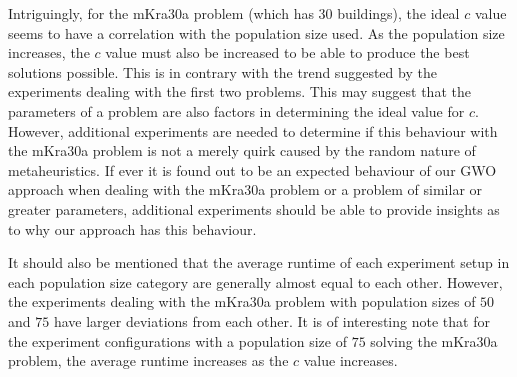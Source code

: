Intriguingly, for the mKra30a problem (which has 30 buildings), the ideal $c$ value seems to have a correlation with the population size used. As the population size increases, the $c$ value must also be increased to be able to produce the best solutions possible. This is in contrary with the trend suggested by the experiments dealing with the first two problems. This may suggest that the parameters of a problem are also factors in determining the ideal value for $c$. However, additional experiments are needed to determine if this behaviour with the mKra30a problem is not a merely quirk caused by the random nature of metaheuristics. If ever it is found out to be an expected behaviour of our GWO approach when dealing with the mKra30a problem or a problem of similar or greater parameters, additional experiments should be able to provide insights as to why our approach has this behaviour.

It should also be mentioned that the average runtime of each experiment setup in each population size category are generally almost equal to each other. However, the experiments dealing with the mKra30a problem with population sizes of $50$ and $75$ have larger deviations from each other. It is of interesting note that for the experiment configurations with a population size of $75$ solving the mKra30a problem, the average runtime increases as the $c$ value increases.

